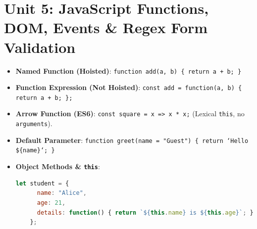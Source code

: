 \documentclass[a4paper,11pt]{article}
\begin{document}
\newpage
\section{Unit 5: JavaScript Functions, DOM, Events \& Regex Form Validation}

\begin{conceptbox}
\begin{itemize}[leftmargin=*]
    \item \textbf{Named Function (Hoisted)}: \texttt{function add(a, b) \{ return a + b; \}}
    \item \textbf{Function Expression (Not Hoisted)}: \texttt{const add = function(a, b) \{ return a + b; \};}
    \item \textbf{Arrow Function (ES6)}: \texttt{const square = x => x * x;} (Lexical \texttt{this}, no \texttt{arguments}).
    \item \textbf{Default Parameter}: \texttt{function greet(name = "Guest") \{ return `Hello \$\{name\}`; \}}
    \item \textbf{Object Methods \& \texttt{this}}:
    \begin{lstlisting}[language=JavaScript]
    let student = {
      name: "Alice",
      age: 21,
      details: function() { return `${this.name} is ${this.age}`; }
    };
    \end{lstlisting}
\end{itemize}
\end{conceptbox}
\end{document}
